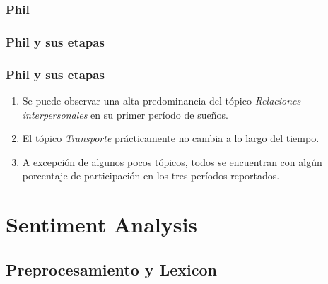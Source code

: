 \documentclass{beamer}
\begin{document}
\subsubsection{Phil}

\begin{frame}
\frametitle{Phil y sus etapas}
\end{frame}

\begin{frame}
\frametitle{Phil y sus etapas}
\begin{enumerate}
    \item Se puede observar una alta predominancia del tópico \textit{Relaciones interpersonales} en su primer período de sueños.
    \item El tópico \textit{Transporte} prácticamente no cambia a lo largo del tiempo.
    \item A excepción de algunos pocos tópicos, todos se encuentran con algún porcentaje de participación en los tres períodos reportados.
\end{enumerate}
\end{frame}

\section{Sentiment Analysis}

\subsection{Preprocesamiento y Lexicon}
\end{document}
